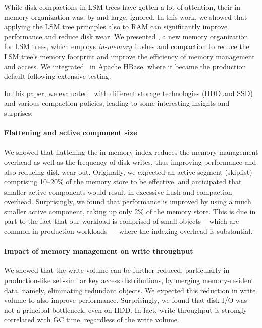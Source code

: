 
While disk compactions in LSM trees have gotten a lot of attention, their in-memory organization was, by and large,  ignored.
In this work, we showed that applying the LSM tree principles also to RAM can significantly improve performance and reduce disk wear. 
We presented \sys, a new memory organization for LSM trees, which employs \emph{in-memory} flushes and 
compaction to reduce the LSM tree's memory footprint and improve the efficiency of memory management and access. 
We integrated \sys\ in Apache HBase, where it became the production default following extensive testing. 

In this paper, we evaluated \sys\ with different storage technologies (HDD and SSD) and various compaction policies, leading
to some interesting insights and surprises:

\paragraph{Flattening and active component size}
We showed that flattening the in-memory index reduces the memory management overhead as well as the frequency of
disk writes, thus  improving performance and also reducing disk wear-out. Originally, we expected  an active segment
(skiplist) comprising 10--20\% of the memory store to be effective, and anticipated that smaller active components would 
result in excessive flush and compaction overhead. Surprisingly, we found that performance is improved by using a much 
smaller active component, taking up only 2\% of the memory store. This is due in part to the fact that our workload is comprised
of small objects -- which are common in production workloads~\cite{Wu2015} -- where the indexing overhead is substantial.   

\paragraph{Impact of memory management on write throughput}
We showed that the write volume can be further reduced, particularly in production-like self-similar key access distributions, by merging memory-resident data, namely, eliminating redundant objects.
We expected this reduction in write volume to also improve performance. Surprisingly, we found that 
disk I/O was not a principal bottleneck, even on HDD. In fact, write throughput is strongly correlated with GC time, 
regardless of the write volume.

